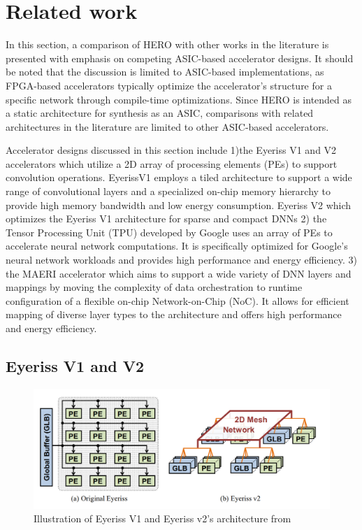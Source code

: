\section{Related work}
\label{chap:related_work}

In this section, a comparison of HERO with other works in the literature
is presented with emphasis on competing ASIC-based accelerator designs. It should be
noted that the discussion is limited to ASIC-based implementations, as
FPGA-based accelerators typically optimize the accelerator's structure for a
specific network through compile-time optimizations. Since HERO is intended as a
static architecture for synthesis as an ASIC, comparisons with related
architectures in the literature are limited to other ASIC-based accelerators.

Accelerator designs discussed in this section include 1)the Eyeriss V1 and V2
accelerators \cite{isscc_2016_chen_eyeriss} which utilize a 2D array of
processing elements (PEs) to support convolution operations. EyerissV1 employs a
tiled architecture to support a wide range of convolutional layers and a
specialized on-chip memory hierarchy to provide high memory bandwidth and low
energy consumption. Eyeriss V2 which optimizes the Eyeriss V1 architecture for
sparse and compact DNNs 2) the Tensor Processing Unit (TPU) \cite{tpu} developed
by Google uses an array of PEs to accelerate neural network computations. It is
specifically optimized for Google's neural network workloads and provides high
performance and energy efficiency. 3) the MAERI accelerator \cite{maeri} which
aims to support a wide variety of DNN layers and mappings by moving the
complexity of data orchestration to runtime configuration of a flexible on-chip
Network-on-Chip (NoC). It allows for efficient mapping of diverse layer types to
the architecture and offers high performance and energy efficiency.

\subsection{Eyeriss V1 and V2}
\label{chap:related_work:eyeriss}

\begin{figure}[!ht]
    \centering
    \includegraphics[scale=0.3]{fig/eyeriss.png}
    \caption{Illustration of Eyeriss V1 and Eyeriss v2's architecture from \cite{isscc_2016_chen_eyeriss}}
    \label{fig:eyeriss_arch}
\end{figure}

